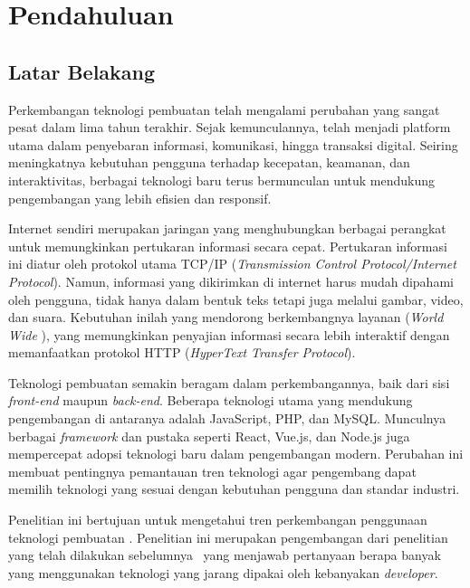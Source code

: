 \chapter{Pendahuluan}
\label{chap:intro}
   
\section{Latar Belakang}
\label{sec:label}

Perkembangan teknologi pembuatan \web telah mengalami perubahan yang sangat pesat dalam lima tahun terakhir. Sejak kemunculannya, \web telah menjadi platform utama dalam penyebaran informasi, komunikasi, hingga transaksi digital. Seiring meningkatnya kebutuhan pengguna terhadap kecepatan, keamanan, dan interaktivitas, berbagai teknologi baru terus bermunculan untuk mendukung pengembangan \web yang lebih efisien dan responsif.

Internet sendiri merupakan jaringan yang menghubungkan berbagai perangkat untuk memungkinkan pertukaran informasi secara cepat. Pertukaran informasi ini diatur oleh protokol utama TCP/IP (\textit{Transmission Control Protocol/Internet Protocol}). Namun, informasi yang dikirimkan di internet harus mudah dipahami oleh pengguna, tidak hanya dalam bentuk teks tetapi juga melalui gambar, video, dan suara. Kebutuhan inilah yang mendorong berkembangnya layanan \web (\textit{World Wide \web}), yang memungkinkan penyajian informasi secara lebih interaktif dengan memanfaatkan protokol HTTP (\textit{HyperText Transfer Protocol}).

Teknologi pembuatan \web semakin beragam dalam perkembangannya, baik dari sisi \textit{front-end} maupun \textit{back-end}. Beberapa teknologi utama yang mendukung pengembangan \web di antaranya adalah JavaScript, PHP, dan MySQL. Munculnya berbagai \textit{framework} dan pustaka seperti React, Vue.js, dan Node.js juga mempercepat adopsi teknologi baru dalam pengembangan \web modern. Perubahan ini membuat pentingnya pemantauan tren teknologi \web agar pengembang dapat memilih teknologi yang sesuai dengan kebutuhan pengguna dan standar industri.

Penelitian ini bertujuan untuk mengetahui tren perkembangan penggunaan teknologi pembuatan \web. Penelitian ini merupakan pengembangan dari penelitian yang telah dilakukan sebelumnya~\cite{Nugroho} yang menjawab pertanyaan berapa banyak \web yang menggunakan teknologi yang jarang dipakai oleh kebanyakan \textit{developer}.


